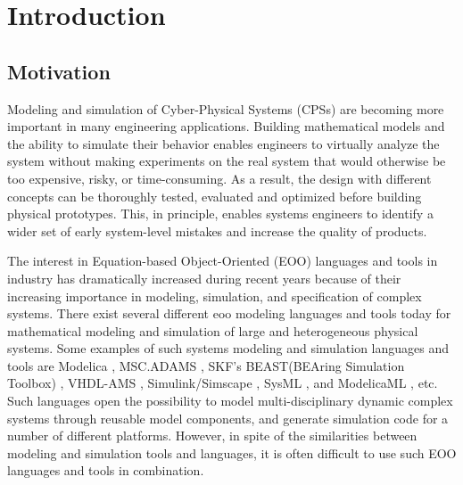 

\chapter{Introduction}
\label{cha:introduction}


\section{Motivation}
\label{sec:motivation}

Modeling and simulation of Cyber-Physical Systems (CPSs) are becoming more important in many engineering applications. Building mathematical models and the ability to simulate their behavior enables engineers to virtually analyze the system without making experiments on the real system that would otherwise be too expensive, risky, or time-consuming. As a result, the design with different concepts can be thoroughly tested, evaluated and optimized before building physical prototypes. This, in principle, enables systems engineers to identify a wider set of early system-level mistakes and increase the quality of products.

The interest in Equation-based Object-Oriented (EOO) languages and tools in industry has dramatically increased during recent years because of their increasing importance in modeling, simulation, and specification of complex systems. There exist several different \acrshort{eoo} modeling languages and tools today for mathematical modeling and simulation of large and heterogeneous physical systems. Some examples of such systems modeling and simulation languages and tools are Modelica \cite{modelica}, MSC.ADAMS \cite{adams}, SKF’s BEAST(BEAring Simulation Toolbox) \cite{beast}, VHDL-AMS \cite{vhdlamsernst, vhdlamsieee}, Simulink/Simscape \cite{simulink}, SysML \cite{sysml,sysmlmorgan}, and ModelicaML \cite{modelicamlreport, modelicaml}, etc. Such languages open the possibility to model multi-disciplinary dynamic complex systems through reusable model components, and generate simulation code  for a number of different platforms. However, in spite of the similarities between modeling and simulation tools and languages, it is often difficult to use such EOO languages and tools in combination.

